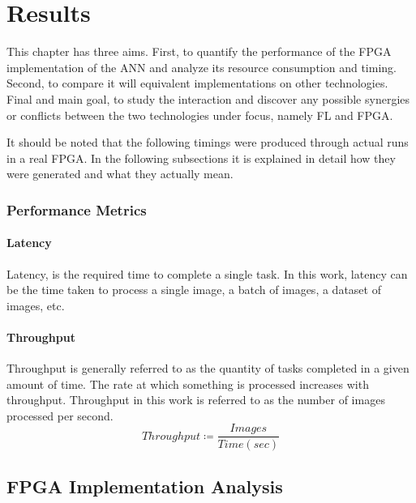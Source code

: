 \chapter{Results}
\label{Chapter-Results}
This chapter has three aims. First, to quantify the performance of the FPGA implementation of the ANN and analyze its resource consumption and timing. Second, to compare it will equivalent implementations on other technologies. Final and main goal, to study the interaction and discover any possible synergies or conflicts between the two technologies under focus, namely FL and FPGA. %

It should be noted that the following timings were produced through actual runs in a real FPGA. In the following subsections it is explained in detail how they were generated and what they actually mean.

\subsection*{Performance Metrics}

\subsubsection{Latency}
Latency, is the required time to complete a single task. In this work, latency can be the time taken to process a single image, a batch of images, a dataset of images, etc. %

\subsubsection{Throughput}
Throughput is generally referred to as the quantity of tasks completed in a given amount of time. The rate at which something is processed increases with throughput. Throughput in this work is referred to as the number of images processed per second. %
\begin{equation}
	Throughput \coloneqq \frac{Images}{Time (sec)}
	\label{eqn: Throughput definition}
\end{equation}

\section{FPGA Implementation Analysis}

